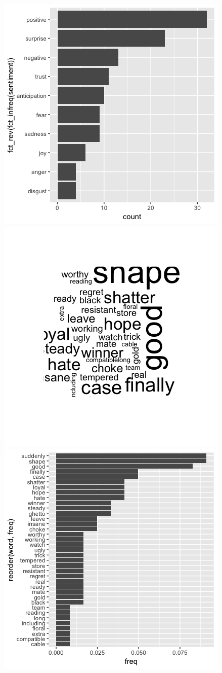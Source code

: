 \documentclass{article}
\begin{document}
\includegraphics{PS6a_Tao.png}
\includegraphics{PS6b_Tao.png}
\includegraphics{PS6c_Tao.png}
\end{document}
